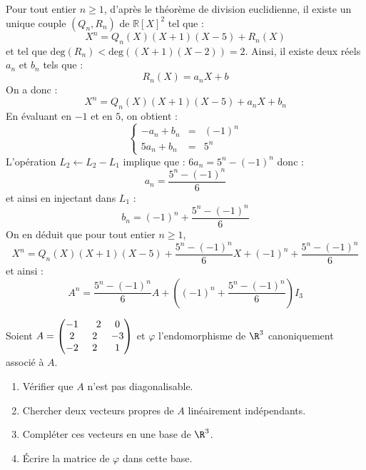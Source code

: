 \documentclass[a4paper,10pt]{report}
\begin{document}
\medskip

\noindent Pour tout entier $n \geq 1$, d'après le théorème de division euclidienne, il existe un unique couple $(Q_n,R_n)$ de $\mathbb{R}[X]^2$ tel que :
$$ X^n = Q_n(X) (X+1)(X-5) + R_n(X)$$
et tel que $\textrm{deg}(R_n)<\textrm{deg}((X+1)(X-2))=2$. Ainsi, il existe deux réels $a_n$ et $b_n$ tels que :
$$ R_n(X)= a_n X + b$$
On a donc :
$$ X^n = Q_n(X) (X+1)(X-5) + a_n X + b_n$$
En évaluant en $-1$ et en $5$, on obtient :
$$ \left\lbrace \begin{array}{ccl}
-a_n + b_n & = & (-1)^n \\
5a_n + b_n & = & 5^n
\end{array}\right.$$
L'opération $L_2 \leftarrow L_2- L_1$ implique que : $6 a_n = 5^n - (-1)^n$ donc :
$$ a_n = \dfrac{5^n-(-1)^n}{6}$$
et ainsi en injectant dans $L_1$ :
$$ b_n = (-1)^n + \dfrac{5^n-(-1)^n}{6}$$
On en déduit que pour tout entier $n \geq 1$,
$$ X^n = Q_n(X) (X+1)(X-5) +\dfrac{5^n-(-1)^n}{6}  X + (-1)^n + \dfrac{5^n-(-1)^n}{6}$$
et ainsi :
$$ A^n = \dfrac{5^n-(-1)^n}{6}  A + \left((-1)^n + \dfrac{5^n-(-1)^n}{6}\right) I_3$$


\begin{Exercice}{} Soient $A = \begin{pmatrix} -1 &\phantom-2 & 0 \cr 2 &2 &-3 \cr -2 &2 &1 \cr \end{pmatrix}$ et $\varphi$ l'endomorphisme de $\R^3$ canoniquement associé à $A$.

\begin{enumerate}
  \item Vérifier que $A$ n'est pas diagonalisable.
    
  \item Chercher deux vecteurs propres de $A$ linéairement indépendants.
    
  \item Compléter ces vecteurs en une base de $\R^3$.
    
  \item \'Ecrire la matrice de $\varphi$ dans cette base.
        
\end{enumerate}
\end{Exercice} 

\corr
\end{document}
